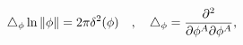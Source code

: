 \begin{equation}
\bigtriangleup _{{\bf \phi }}\ln \| \phi \| =2\pi \delta ^2({\bf
\phi })\quad ,\quad \bigtriangleup _{{\bf \phi }}=\frac{\partial
^2}{\partial \phi ^A\partial \phi ^A},
\end{equation}

